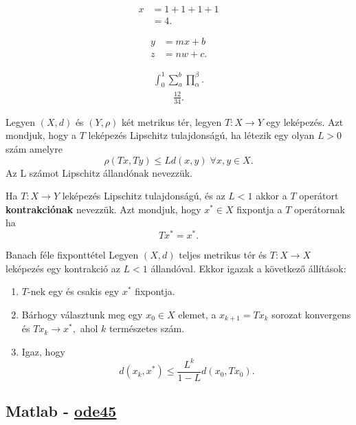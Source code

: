 	\begin{align}
	x&=1+1+1+1\\
	&=4.
\end{align}

	\begin{align}
	y&=mx+b\nonumber\\
	z&=nw+c.
\end{align}

			\begin{align}
	\int_0^1\sum_a^b\prod_\alpha^\beta.
\end{align}
	\begin{align*}
	\frac{12}{34}.
\end{align*}



\begin{definition}
	Legyen $\left(X,d\right)$ \'es $\left(Y,\rho\right)$ k\'et metrikus
	t\'er, legyen $T:X\to Y$ egy lek\'epez\'es. Azt mondjuk, hogy a $T$ lek\'epez\'es
	Lipschitz tulajdons\'ag\'u, ha l\'etezik egy olyan $L>0$ sz\'am amelyre 
	\[
	\rho\left(Tx,Ty\right)\leq Ld(x,y)\;\forall x,y\in X.
	\]
	Az L sz\'amot Lipschitz \'alland\'onak nevezz\"uk.
\end{definition}


Ha $T:X\to Y$ lek\'epez\'es Lipschitz tulajdons\'ag\'u, \'es az $L<1$ akkor
a $T$ oper\'atort \textbf{kontrakci\'onak} nevezz\"uk. Azt mondjuk, hogy
$x^{*}\in X$ fixpontja a $T$ oper\'atornak ha 
\[
Tx^{*}=x^{*}.
\]
\begin{theorem}{Banach f\'ele fixpontt\'etel}
	Legyen $\left(X,d\right)$ teljes metrikus t\'er \'es $T:X\to X$ lek\'epez\'es
	egy kontrakci\'o az $L<1$ \'alland\'oval. Ekkor igazak a k\"ovetkez\H{o}
	\'all\'it\'asok:
	\begin{enumerate}
		\item $T$-nek egy \'es csakis egy $x^{*}$ fixpontja.
		\item B\'arhogy v\'alasztunk meg egy $x_{0}\in X$ elemet, a $x_{k+1}=Tx_{k}$
		sorozat konvergens \'es $Tx_{k}\to x^{*},$ ahol $k$ term\'eszetes sz\'am.
		\item Igaz, hogy 
		\[
		d\left(x_{k},x^{*}\right)\leq\frac{L^{k}}{1-L}d(x_{0},Tx_{0}).
		\]
	\end{enumerate}
\end{theorem}



\subsection {Matlab - \href{https://www.mathworks.com/help/matlab/ref/ode45.html}{ode45}} \label{MatlabOde45}

